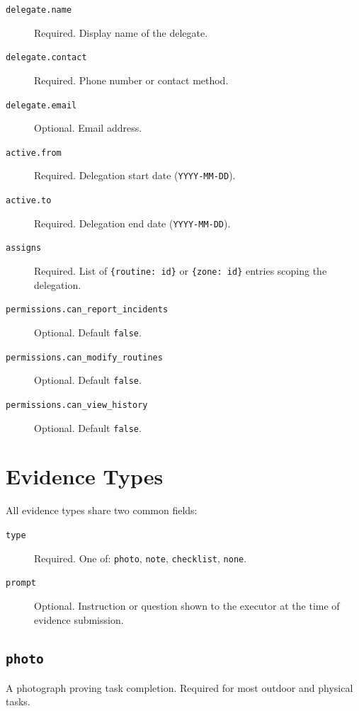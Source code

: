 \begin{description}
  \item[\texttt{delegate.name}] Required. Display name of the delegate.
  \item[\texttt{delegate.contact}] Required. Phone number or contact method.
  \item[\texttt{delegate.email}] Optional. Email address.
  \item[\texttt{active.from}] Required. Delegation start date (\texttt{YYYY-MM-DD}).
  \item[\texttt{active.to}] Required. Delegation end date (\texttt{YYYY-MM-DD}).
  \item[\texttt{assigns}] Required. List of \texttt{\{routine: id\}} or
        \texttt{\{zone: id\}} entries scoping the delegation.
  \item[\texttt{permissions.can\_report\_incidents}] Optional. Default \texttt{false}.
  \item[\texttt{permissions.can\_modify\_routines}] Optional. Default \texttt{false}.
  \item[\texttt{permissions.can\_view\_history}] Optional. Default \texttt{false}.
\end{description}

\section{Evidence Types}
\label{sec:schema-evidence}

All evidence types share two common fields:

\begin{description}
  \item[\texttt{type}] Required. One of: \texttt{photo}, \texttt{note},
        \texttt{checklist}, \texttt{none}.
  \item[\texttt{prompt}] Optional. Instruction or question shown to the executor at the
        time of evidence submission.
\end{description}

\subsection{\texttt{photo}}

A photograph proving task completion. Required for most outdoor and physical tasks.

